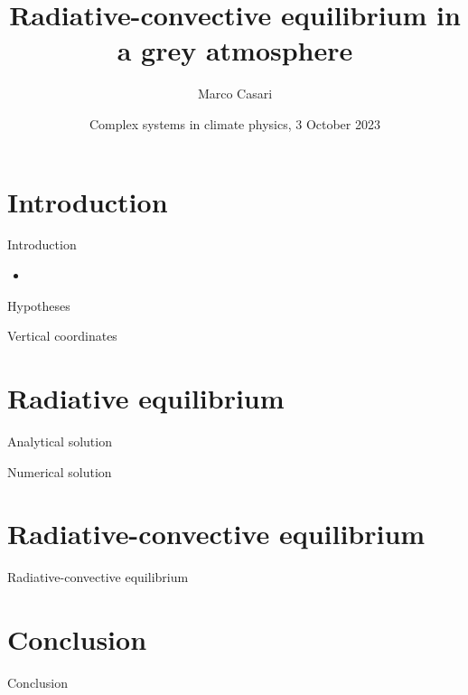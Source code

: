 \documentclass[aspectratio=43]{beamer}
\title{Radiative-convective equilibrium in a grey atmosphere}
\author{Marco Casari}
\date[03/10/2023]{Complex systems in climate physics, 3 October 2023}
\institute[UniTo]{University of Turin}
\begin{document}
\begin{frame}
  \titlepage
\end{frame}

\section{Introduction}
\begin{frame}{Introduction}
  \begin{itemize}
    \item<1-> 
  \end{itemize}
\end{frame}

\begin{frame}{Hypotheses}
\end{frame}

\begin{frame}{Vertical coordinates}
\end{frame}



\section{Radiative equilibrium}
\begin{frame}{Analytical solution}
\end{frame}

\begin{frame}{Numerical solution}
\end{frame}



\section{Radiative-convective equilibrium}
\begin{frame}{Radiative-convective equilibrium}
\end{frame}



\section{Conclusion}
\begin{frame}{Conclusion}
\end{frame}
\end{document}
